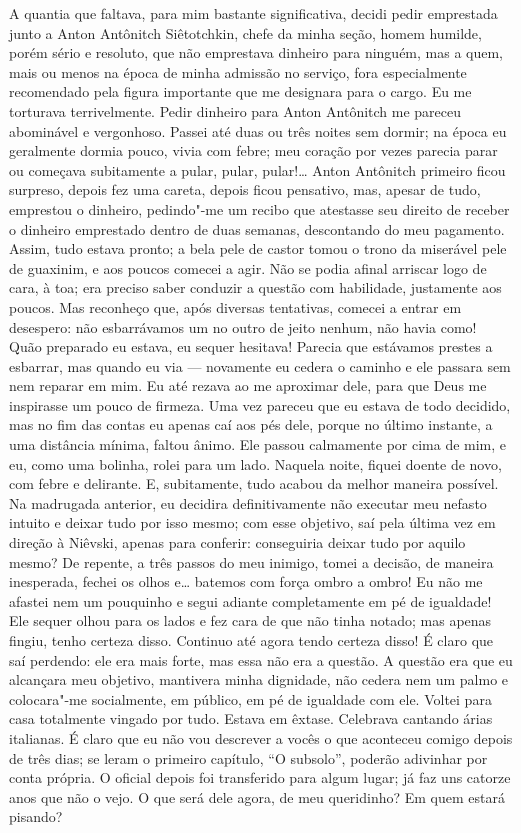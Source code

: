A quantia que faltava, para mim bastante significativa, decidi pedir
emprestada junto a Anton Antônitch Siêtotchkin, chefe da minha seção,
homem humilde, porém sério e resoluto, que não emprestava dinheiro para
ninguém, mas a quem, mais ou menos na época de minha admissão no
serviço, fora especialmente recomendado pela figura importante que me
designara para o cargo. Eu me torturava terrivelmente. Pedir dinheiro
para Anton Antônitch me pareceu abominável e vergonhoso. Passei até
duas ou três noites sem dormir; na época eu geralmente dormia pouco,
vivia com febre; meu coração por vezes parecia parar ou começava
subitamente a pular, pular, pular!\ldots{} Anton Antônitch primeiro ficou
surpreso, depois fez uma careta, depois ficou pensativo, mas, apesar de
tudo, emprestou o dinheiro, pedindo"-me um recibo que atestasse seu
direito de receber o dinheiro emprestado dentro de duas semanas,
descontando do meu pagamento. Assim, tudo estava pronto; a bela pele de
castor tomou o trono da miserável pele de guaxinim, e aos poucos
comecei a agir. Não se podia afinal arriscar logo de cara, à toa; era
preciso saber conduzir a questão com habilidade, justamente aos poucos.
Mas reconheço que, após diversas tentativas, comecei a entrar em
desespero: não esbarrávamos um no outro de jeito nenhum, não havia
como! Quão preparado eu estava, eu sequer hesitava! Parecia que
estávamos prestes a esbarrar, mas quando eu via --- novamente eu cedera o
caminho e ele passara sem nem reparar em mim. Eu até rezava ao me     
aproximar dele, para que Deus me inspirasse um pouco de firmeza. Uma
vez pareceu que eu estava de todo decidido, mas no fim das contas eu
apenas caí aos pés dele, porque no último instante, a uma distância
mínima, faltou ânimo. Ele passou calmamente por cima de mim, e eu, como
uma bolinha, rolei para um lado. Naquela noite, fiquei doente de novo,
com febre e delirante. E, subitamente, tudo acabou da melhor maneira
possível. Na madrugada anterior, eu decidira definitivamente não
executar meu nefasto intuito e deixar tudo por isso mesmo; com esse
objetivo, saí pela última vez em direção à Niêvski, apenas para
conferir: conseguiria deixar tudo por aquilo mesmo? De repente, a três
passos do meu inimigo, tomei a decisão, de maneira inesperada, fechei
os olhos e\ldots{} batemos com força ombro a ombro! Eu não me afastei nem um
pouquinho e segui adiante completamente em pé de igualdade! Ele sequer
olhou para os lados e fez cara de que não tinha notado; mas apenas
fingiu, tenho certeza disso. Continuo até agora tendo certeza disso! É
claro que saí perdendo: ele era mais forte, mas essa não era a questão.
A questão era que eu alcançara meu objetivo, mantivera minha dignidade,
não cedera nem um palmo e colocara"-me socialmente, em público, em pé de
igualdade com ele. Voltei para casa totalmente vingado por tudo. Estava
em êxtase. Celebrava cantando árias italianas. É claro que eu não vou
descrever a vocês o que aconteceu comigo depois de três dias; se leram
o primeiro capítulo, “O subsolo”, poderão adivinhar por conta própria.
O oficial depois foi transferido para algum lugar; já faz uns catorze
anos que não o vejo. O que será dele agora, de meu queridinho? Em quem
estará pisando?



